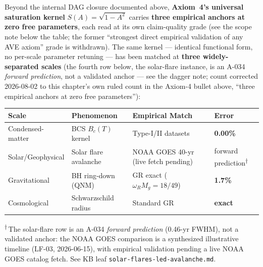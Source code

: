 Beyond the internal DAG closure documented above, \textbf{Axiom~4's universal saturation kernel} $S(A) = \sqrt{1 - A^2}$ carries \textbf{three empirical anchors at zero free parameters}, each read at its own claim-quality grade (see the scope note below the table; the former ``strongest direct empirical validation of any AVE axiom'' grade is withdrawn). The same kernel --- identical functional form, no per-scale parameter retuning --- has been matched at \textbf{three widely-separated scales} (the fourth row below, the solar-flare instance, is an A-034 \emph{forward prediction}, not a validated anchor --- see the dagger note; count corrected 2026-08-02 to this chapter's own ruled count in the Axiom-4 bullet above, ``three empirical anchors at zero free parameters''):

\begin{center}
\renewcommand{\arraystretch}{1.3}
\small
\begin{tabular}{@{}l p{3.5cm} p{3.0cm} l@{}}
\toprule
\textbf{Scale} & \textbf{Phenomenon} & \textbf{Empirical Match} & \textbf{Error} \\
\midrule
Condensed-matter & BCS $B_c(T)$ kernel  & Type-I/II datasets    & \textbf{0.00\%} \\
Solar/Geophysical & Solar flare avalanche & NOAA GOES 40-yr (live fetch pending) & forward prediction\textsuperscript{$\dagger$} \\
Gravitational    & BH ring-down (QNM)   & GR exact ($\omega_R M_g = 18/49$) & \textbf{1.7\%} \\
Cosmological     & Schwarzschild radius & Standard GR             & \textbf{exact} \\
\bottomrule
\end{tabular}
\end{center}

\noindent\footnotesize\textsuperscript{$\dagger$}\,The solar-flare row is an A-034 \emph{forward prediction} (0.46-yr FWHM), not a validated anchor: the NOAA GOES comparison is a synthesized illustrative timeline (LF-03, 2026-06-15), with empirical validation pending a live NOAA GOES catalog fetch. See KB leaf \texttt{solar-flares-led-avalanche.md}.\normalsize

